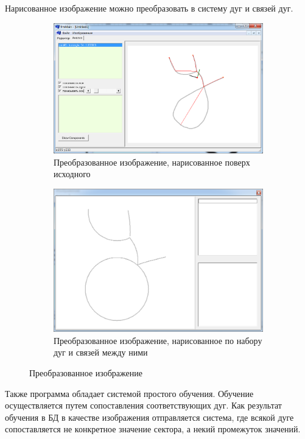 Нарисованное изображение можно преобразовать в систему дуг и связей дуг.

\begin{figure}[h]
	\begin{subfigure}{.45\textwidth}
		\centering
		\includegraphics[width=.9\linewidth]{images/an_convertor_1.png}
		\caption{Преобразованное изображение, нарисованное поверх исходного}
	\end{subfigure}
	\begin{subfigure}{.45\textwidth}
		\centering
		\includegraphics[width=.9\linewidth]{images/an_convertor_3.png}
		\caption{Преобразованное изображение, нарисованное по набору дуг и связей между ними}
	\end{subfigure}
	\caption{Преобразованное изображение}
\end{figure}

Также программа обладает системой простого обучения. Обучение осуществляется путем сопоставления соответствующих дуг. Как результат обучения в БД в качестве изображения отправляется система, где всякой дуге сопоставляется не конкретное значение сектора, а некий промежуток значений.

